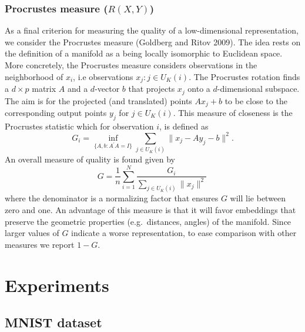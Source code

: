 \documentclass[12pt]{article}
\begin{document}
\hypertarget{procrustes-measure-rxy}{%
\subsubsection*{\texorpdfstring{Procrustes measure (\(R(X,Y)\))}{Procrustes measure (R(X,Y))}}\label{procrustes-measure-rxy}}

As a final criterion for measuring the quality of a low-dimensional representation, we consider the Procrustes measure (Goldberg and Ritov 2009). The idea rests on the definition of a manifold as a being locally isomorphic to Euclidean space. More concretely, the Procrustes measure considers observations in the neighborhood of \(x_i\), i.e observations \(x_j:j\in U_K(i)\). The Procrustes rotation finds a \(d\times p\) matrix \(A\) and a \(d\)-vector \(b\) that projects \(x_j\) onto a \(d\)-dimensional subspace. The aim is for the projected (and translated) points \(Ax_j+b\) to be close to the corresponding output points \(y_j\) for \(j\in U_K(i)\). This measure of closeness is the Procrustes statistic which for observation \(i\), is defined as
\begin{equation}\label{eq:procstats}
  G_i= \inf _{\{A,b: A^{\prime} A=I\}} \sum_{j\in U_K(i)}\|x_{j}-A y_{j}-b\|^{2}.
\end{equation}
An overall measure of quality is found given by
\begin{equation}\label{eq:procmeasure}
  G=\frac{1}{n}\sum\limits_{i=1}^N\frac{G_i}{\sum_{j\in U_K(i)}\|x_{j}\|^{2}}\,
\end{equation}
where the denominator is a normalizing factor that ensures \(G\) will lie between zero and one. An advantage of this measure is that it will favor embeddings that preserve the geometric properties (e.g.~distances, angles) of the manifold. Since larger values of \(G\) indicate a worse representation, to ease comparison with other measures we report \(1-G\).

\hypertarget{experiment}{%
\section{Experiments}\label{experiment}}

\hypertarget{mnist-dataset}{%
\subsection{MNIST dataset}\label{mnist-dataset}}
\end{document}
